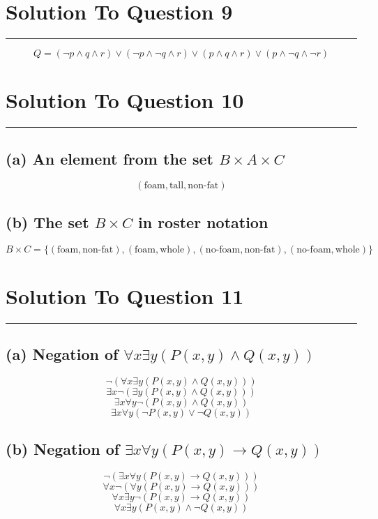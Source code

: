 \documentclass{article}
\begin{document}
\section*{Solution To Question 9}
\hrule

\[
Q = (\neg p \land q \land r) \lor (\neg p \land \neg q \land r) \lor (p \land q \land r) \lor (p \land \neg q \land \neg r)
\]



\newpage

\section*{Solution To Question 10}
\hrule

\subsection*{(a) An element from the set \( B \times A \times C \)}

\[ (\text{foam}, \text{tall}, \text{non-fat}) \]

\subsection*{(b) The set \( B \times C \) in roster notation}

\[
B \times C = \{(\text{foam}, \text{non-fat}), (\text{foam}, \text{whole}), (\text{no-foam}, \text{non-fat}), (\text{no-foam}, \text{whole})\}
\]





\section*{Solution To Question 11}
\hrule
\subsection*{(a) Negation of \(\forall x \exists y (P(x, y) \land Q(x, y))\)}

\[
\lnot (\forall x \exists y (P(x, y) \land Q(x, y)))
\]
\[
\exists x \lnot (\exists y (P(x, y) \land Q(x, y)))
\]
\[
\exists x \forall y \lnot (P(x, y) \land Q(x, y))
\]
\[
\exists x \forall y (\lnot P(x, y) \lor \lnot Q(x, y))
\]
\subsection*{(b) Negation of \(\exists x \forall y (P(x, y) \rightarrow Q(x, y))\)}
\[
\lnot (\exists x \forall y (P(x, y) \rightarrow Q(x, y)))
\]
\[
\forall x \lnot (\forall y (P(x, y) \rightarrow Q(x, y)))
\]
\[
\forall x \exists y \lnot (P(x, y) \rightarrow Q(x, y))
\]
\[
\forall x \exists y (P(x, y) \land \lnot Q(x, y))
\]
\end{document}
